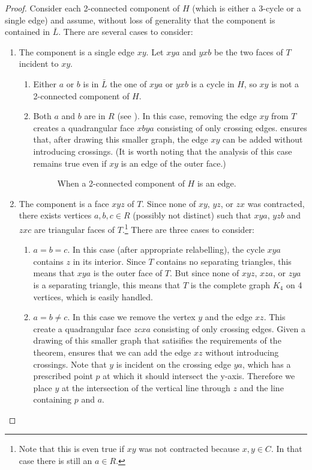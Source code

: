 \documentclass{patmorin}
\begin{document}
\begin{proof}
   Consider each 2-connected component of $H$ (which is either a 3-cycle
   or a single edge) and assume, without loss of generality that the
   component is contained in $\bar L$.  There are several cases to
   consider:
   \begin{enumerate}
	\item The component is a single edge $xy$.  Let $xya$ and $yxb$
	be the two faces of $T$ incident to $xy$.
        \begin{enumerate}
            \item Either $a$ or $b$ is in $\bar L$ the one of $xya$
            or $yxb$ is a cycle in $H$, so $xy$ is not a 2-connected
            component of $H$.  
            \item Both $a$ and $b$ are in $R$ (see ).  In this
            case, removing the edge $xy$ from $T$ creates a quadrangular
            face $xbya$ consisting of only crossing edges. 
            ensures that, after drawing this smaller graph, the edge $xy$
            can be added without introducing crossings.  (It is worth
            noting that the analysis of this case remains true even if
            $xy$ is an edge of the outer face.)
            \begin{figure}
               \caption{When a 2-connected component of $H$ is an edge.}
            \end{figure}
        \end{enumerate}
        \item The component is a face $xyz$ of $T$.  Since none of $xy$,
        $yz$, or $zx$ was contracted, there exists vertices $a,b,c\in R$
        (possibly not distinct) such that $xya$, $yzb$ and $zxc$ are
        triangular faces of $T$.\footnote{Note that this is even true if
        $xy$ was not contracted because $x,y\in C$. In that case there
        is still an $a\in R$.}  There are three cases to consider:
        \begin{enumerate}
          \item $a=b=c$.  In this case (after appropriate relabelling),
            the cycle $xya$ contains $z$ in its interior.  Since $T$
            contains no separating triangles, this means that $xya$
            is the outer face of $T$. But since none of $xyz$, $xza$,
            or $zya$ is a separating triangle, this means that $T$ is the
            complete graph $K_4$ on 4 vertices, which is easily handled.
          \item $a=b\neq c$. In this case we remove the vertex $y$
            and the edge $xz$.  This create a quadrangular face $zcxa$
            consisting of only crossing edges.  Given a drawing of
            this smaller graph that satisifies the requirements of the
            theorem,  ensures that we can add the edge $xz$
            without introducing crossings.  Note that $y$ is incident
            on the crossing edge $ya$, which has a prescribed point $p$
            at which it should intersect the y-axis.  Therefore we place
            $y$ at the intersection of the vertical line through $z$
            and the line containing $p$ and $a$.


\end{enumerate}
\end{enumerate}
\end{proof}
\end{document}
